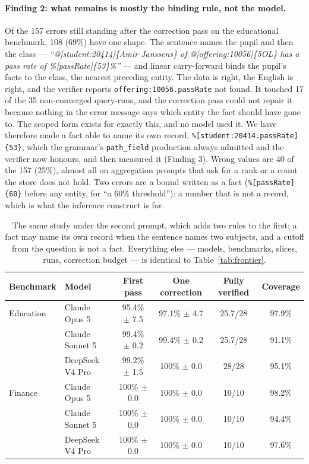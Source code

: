 \documentclass[11pt,a4paper]{article}
\begin{document}
\paragraph{Finding 2: what remains is mostly the binding rule, not the model.} Of the 157 errors still standing after the correction pass on the educational benchmark, 108 (69\%) have one shape. The sentence names the pupil and then the class --- \textit{``@[student:20414]\{Amir Janssens\} of @[offering:10056]\{5OL\} has a pass rate of \%[passRate]\{53\}\%''} --- and linear carry-forward binds the pupil's facts to the class, the nearest preceding entity. The data is right, the English is right, and the verifier reports \texttt{offering:10056.passRate} not found. It touched 17 of the 35 non-converged query-runs, and the correction pass could not repair it because nothing in the error message says which entity the fact should have gone to. The scoped form exists for exactly this, and no model used it. We have therefore made a fact able to name its own record, \texttt{\%[student:20414.passRate]\{53\}}, which the grammar's \texttt{path\_field} production always admitted and the verifier now honours, and then measured it (Finding 3). Wrong values are 40 of the 157 (25\%), almost all on aggregation prompts that ask for a rank or a count the store does not hold. Two errors are a bound written as a fact (\texttt{\%[passRate]\{60\}} before any entity, for ``a 60\% threshold''): a number that is not a record, which is what the inference construct is for.

\begin{table}[h]
\centering
\small
\begin{tabular}{llcccc}
\toprule
\textbf{Benchmark} & \textbf{Model} & \textbf{First pass} & \textbf{One correction} & \textbf{Fully verified} & \textbf{Coverage} \\
\midrule
Education & Claude Opus 5 & 95.4\% $\pm$ 7.5 & 97.1\% $\pm$ 4.7 & 25.7/28 & 97.9\% \\
 & Claude Sonnet 5 & 99.4\% $\pm$ 0.2 & 99.4\% $\pm$ 0.2 & 25.7/28 & 91.1\% \\
 & DeepSeek V4 Pro & 99.2\% $\pm$ 1.5 & 100\% $\pm$ 0.0 & 28/28 & 95.1\% \\
\midrule
Finance & Claude Opus 5 & 100\% $\pm$ 0.0 & 100\% $\pm$ 0.0 & 10/10 & 98.2\% \\
 & Claude Sonnet 5 & 100\% $\pm$ 0.0 & 100\% $\pm$ 0.0 & 10/10 & 94.4\% \\
 & DeepSeek V4 Pro & 100\% $\pm$ 0.0 & 100\% $\pm$ 0.0 & 10/10 & 97.6\% \\
\bottomrule
\end{tabular}
\caption{The same study under the second prompt, which adds two rules to the first: a fact may name its own record when the sentence names two subjects, and a cutoff from the question is not a fact. Everything else --- models, benchmarks, slices, runs, correction budget --- is identical to Table~\ref{tab:frontier}.}
\label{tab:frontier2}
\end{table}
\end{document}
